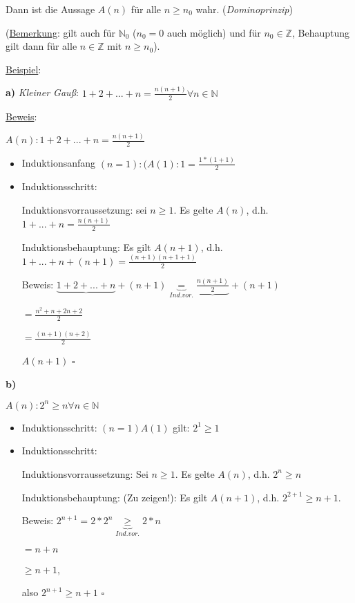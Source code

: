 \documentclass[a4paper, 12pt, twoside] {article}
\begin{document}
Dann ist die Aussage $A(n)$ für alle $n \geq n_0$ wahr. (\textit{Dominoprinzip})

(\underline{Bemerkung}: gilt auch für $\mathbb{N}_0$ ($n_0 = 0$ auch möglich) und für $n_0 \in \mathbb{Z}$, Behauptung gilt dann für alle $n \in \mathbb{Z}$ mit $n \geq n_0$).

\underline{Beispiel}: 

\textbf{a)} \textit{Kleiner Gauß}:
$1 + 2 + ... + n = \frac{n(n+1)}{2} \forall n \in \mathbb{N}$

\underline{Beweis}:

$A(n) : 1 + 2 + ... + n = \frac{n(n+1)}{2}$

\begin{itemize}
\item Induktionsanfang $(n = 1): (A(1): 1 = \frac{1*(1+1)}{2}$
\item Induktionsschritt:

Induktionsvorraussetzung: sei $n \geq 1$. Es gelte $A(n)$, d.h. $1+ ... +n = \frac{n(n+1)}{2}$

Induktionsbehauptung: Es gilt $A(n+1)$, d.h. $1+ ... +n + (n+1) = \frac{(n+1) (n+1 + 1)}{2}$

Beweis: $\underbrace{1 + 2 + ... + n}_{} + (n+1) \underbrace{=}_{Ind.vor.} \underbrace{\frac{n(n+1)}{2}} + (n+1)$

$= \frac{n^2 + n + 2n + 2}{2}$

$=\frac{(n+1)(n+2)}{2}$

$A(n+1)$ $\square$


\end{itemize}

\textbf{b)} 

$A(n): 2^n \geq n \forall n \in \mathbb{N}$
\begin{itemize}
\item Induktionsschritt: $(n = 1 ) A(1)$ gilt: $2^1 \geq 1$
\item Induktionsschritt:

Induktionsvorraussetzung: Sei $n \geq 1$. Es gelte $A(n)$, d.h. $2^n \geq n$

Induktionsbehauptung: (Zu zeigen!): Es gilt $A(n+1)$, d.h. $2^{2+1} \geq n+1$.

Beweis: $2^{n+1} = 2*2^n \underbrace{\geq}_{Ind.vor.} 2 * n$

$= n + n$

$\geq n + 1$,


also $2^{n+1} \geq n+1$ $\square$
\end{itemize}
\end{document}
